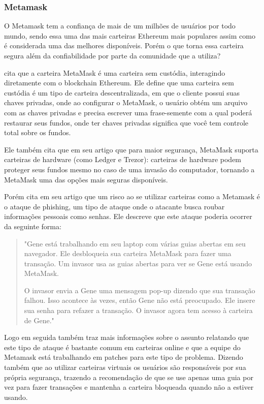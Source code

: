 \subsubsection{Metamask}

O Metamask tem a confiança de mais de um milhões de usuários por todo mundo, sendo essa uma das mais carteiras Ethereum mais populares assim como é considerada uma das melhores disponíveis. Porém o que torna essa carteira segura além da confiabilidade por parte da comunidade que a utiliza?

\citeauthor{metamask_eran} cita que a carteira MetaMask é uma carteira sem custódia, interagindo diretamente com o blockchain Ethereum. Ele define que uma carteira sem custódia é um tipo de carteira descentralizada, em que o cliente possui suas chaves privadas, onde ao configurar o MetaMask, o usuário obtém um arquivo com as chaves privadas e precisa escrever uma frase-semente com a qual poderá restaurar seus fundos, onde ter chaves privadas significa que você tem controle total sobre os fundos. 

Ele também cita que em seu artigo que para maior segurança, MetaMask suporta carteiras de hardware (como Ledger e Trezor): carteiras de hardware podem proteger seus fundos mesmo no caso de uma invasão do computador, tornando a MetaMask uma das opções mais seguras disponíveis. 

Porém \citeauthor{metamask_aaron} cita em seu artigo que um risco ao se utilizar carteiras como a Metamask é o ataque de phishing, um tipo de ataque onde o atacante busca roubar informações pessoais como senhas. Ele descreve que este ataque poderia ocorrer da seguinte forma: 

 \begin{quotation}
"Gene está trabalhando em seu laptop com várias guias abertas em seu navegador. Ele desbloqueia sua carteira MetaMask para fazer uma transação. Um invasor usa as guias abertas para ver se Gene está usando MetaMask.

O invasor envia a Gene uma mensagem pop-up dizendo que sua transação falhou. Isso acontece às vezes, então Gene não está preocupado. Ele insere sua senha para refazer a transação. O invasor agora tem acesso à carteira de Gene."

 \end{quotation}
 
 Logo em seguida \citeauthor{metamask_aaron} também traz mais informações sobre o assunto relatando que este tipo de ataque é bastante comum em carteiras online e que a equipe do Metamask está trabalhando em patches para este tipo de problema. Dizendo também que ao utilizar carteiras virtuais os usuários são responsáveis por sua própria segurança, trazendo a recomendação de que se use apenas uma guia por vez para fazer transações e mantenha a carteira bloqueada quando não a estiver usando.


